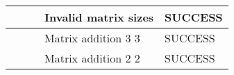\begin{center}
\begin{longtable}{|l|l|l|l|l|}
    &                              &                                 & Invalid matrix sizes          & SUCCESS \\ \hline
    &                              &                                 & Matrix addition 3 3           & SUCCESS \\ \hline
    &                              &                                 & Matrix addition 2 2           & SUCCESS \\ \hline
\end{longtable}
\end{center}

\normalsize